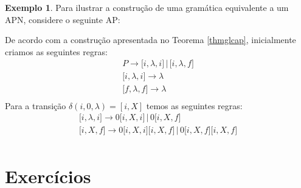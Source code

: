 \documentclass[a4paper]{article}
\theoremstyle{definition}
\newtheorem{Example}{Exemplo}
\begin{document}
  \begin{Example}
    Para ilustrar a construção de uma gramática equivalente a um APN, considere o seguinte AP:
    \begin{figure}[H]
      \centering
    \end{figure}
    De acordo com a construção apresentada no Teorema \ref{thmglcap},
    inicialmente criamos as seguintes regras:
    \[
      \begin{array}{l}
        P \to \lbrack i, \lambda,i \rbrack \,|\, \lbrack i, \lambda,f \rbrack\\
        \lbrack i, \lambda,i \rbrack \to \lambda \\
        \lbrack f, \lambda,f \rbrack \to \lambda \\
      \end{array}
    \]
    Para a transição $\delta(i,0,\lambda) = [i,X]$ temos as seguintes regras:
    \[
      \begin{array}{l}
        \lbrack i, \lambda, i \rbrack \to 0 \lbrack i , X , i \rbrack \,|\, 0
        \lbrack i , X , f \rbrack \\
        \lbrack i, X , f \rbrack \to 0 \lbrack i, X ,i \rbrack \lbrack i, X , f
        \rbrack \,|\, 0 \lbrack i , X , f \rbrack\lbrack i, X , f \rbrack\\
      \end{array}
    \]
  \end{Example}
  
  \section{Exercícios} 
\end{document}
